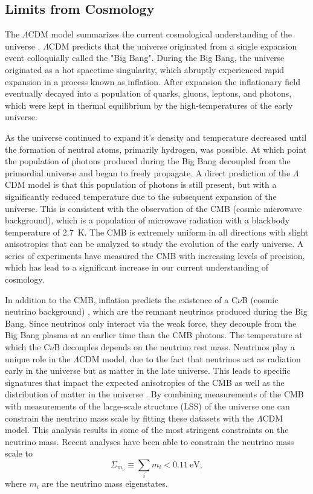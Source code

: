 \subsection{Limits from Cosmology}


The $\Lambda$CDM model summarizes the current cosmological understanding of the universe \cite{Workman:2022ynf}. $\Lambda$CDM predicts that the universe originated from a single expansion event colloquially called the "Big Bang". During the Big Bang, the universe originated as a hot spacetime singularity, which abruptly experienced rapid expansion in a process known as inflation. After expansion the inflationary field eventually decayed into a population of quarks, gluons, leptons, and photons, which were kept in thermal equilibrium by the high-temperatures of the early universe.

As the universe continued to expand it's density and temperature decreased until the formation of neutral atoms, primarily hydrogen, was possible. At which point the population of photons produced during the Big Bang decoupled from the primordial universe and began to freely propagate. A direct prediction of the $\Lambda$CDM model is that this population of photons is still present, but with a significantly reduced temperature due to the subsequent expansion of the universe. This is consistent with the observation of the CMB (cosmic microwave background), which is a population of microwave radiation with a blackbody temperature of 2.7~K. The CMB is extremely uniform in all directions with slight anisotropies that can be analyzed to study the evolution of the early universe. A series of experiments have measured the CMB with increasing levels of precision, which has lead to a significant increase in our current understanding of cosmology.

In addition to the CMB, inflation predicts the existence of a C$\nu$B (cosmic neutrino background) \cite{numass_cosmo}, which are the remnant neutrinos produced during the Big Bang. Since neutrinos only interact via the weak force, they decouple from the Big Bang plasma at an earlier time than the CMB photons. The temperature at which the C$\nu$B decouples depends on the neutrino rest mass. Neutrinos play a unique role in the $\Lambda$CDM model, due to the fact that neutrinos act as radiation early in the universe but as matter in the late universe. This leads to specific signatures that impact the expected anisotropies of the CMB as well as the distribution of matter in the universe \cite{planck2015}. By combining measurements of the CMB with measurements of the large-scale structure (LSS) of the universe one can constrain the neutrino mass scale by fitting these datasets with the $\Lambda$CDM model. This analysis results in some of the most stringent constraints on the neutrino mass. Recent analyses \cite{Workman:2022ynf} have been able to constrain the neutrino mass scale to
\begin{equation}
     \Sigma_{m_\nu} \equiv \sum_{i}m_i<0.11~\mathrm{eV},
\end{equation}
where $m_i$ are the neutrino mass eigenstates. 

